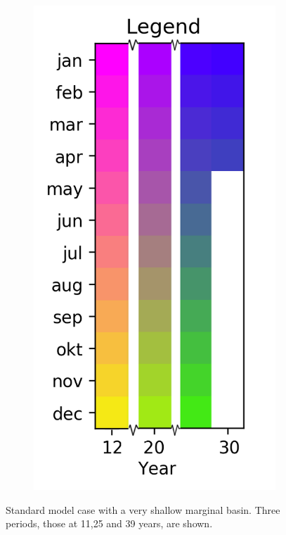 \documentclass[twocolumn]{article}
\begin{document}
\begin{figure}
\begin{subfigure}[h]{0.20\textwidth}
\includegraphics[width=\linewidth,keepaspectratio]{12-30_reduced_legend.png}
\end{subfigure}\hfill
\caption{Standard model case with a very shallow marginal basin. Three periods, those at 11,25 and 39 years, are shown.}
\label{fig:Very_shallow_basin}
\end{figure}
\end{document}
